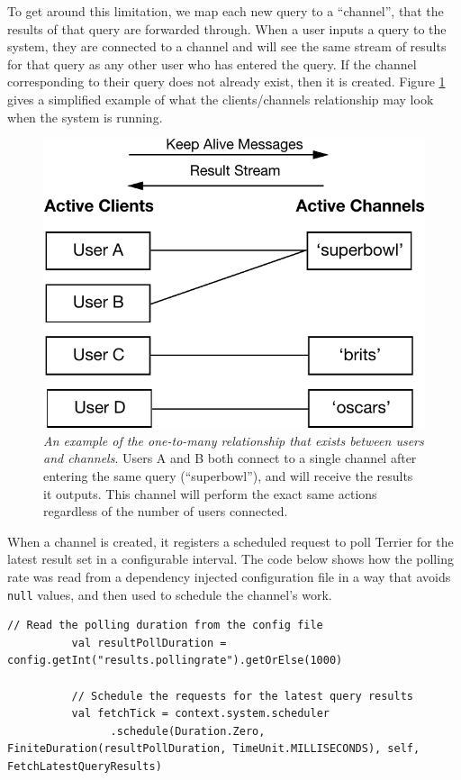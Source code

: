 \documentclass{l4proj}
\newcommand{\code}[1]{\texttt{#1}}
\begin{document}
        To get around this limitation, we map each new query to a ``channel'', that the results of that query are forwarded through. When a user inputs a query to the system, they are connected to a channel and will see the same stream of results for that query as any other user who has entered the query. If the channel corresponding to their query does not already exist, then it is created. Figure \ref{channels} gives a simplified example of what the clients/channels relationship may look when the system is running.
        
\begin{figure}
\centering
\includegraphics[scale=0.75]{channels.pdf}
\caption{\textit{An example of the one-to-many relationship that exists between users and channels}. Users A and B both connect to a single channel after entering the same query (``superbowl''), and will receive the results it outputs. This channel will perform the exact same actions regardless of the number of users connected.}
\label{channels}
\end{figure}     
        
        When a channel is created, it registers a scheduled request to poll Terrier for the latest result set in a configurable interval. The code below shows how the polling rate was read from a dependency injected configuration file in a way that avoids \code{null} values, and then used to schedule the channel's work.
        
        \begin{lstlisting}[caption=Reading configuration from a file and scheduling the updates of results.]
          // Read the polling duration from the config file  
          val resultPollDuration = config.getInt("results.pollingrate").getOrElse(1000)
          
          // Schedule the requests for the latest query results
          val fetchTick = context.system.scheduler
                .schedule(Duration.Zero, FiniteDuration(resultPollDuration, TimeUnit.MILLISECONDS), self, FetchLatestQueryResults)
        \end{lstlisting}
\end{document}
